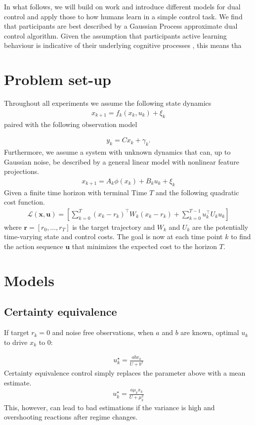 \documentclass[10pt,letterpaper]{article}
\begin{document}
In what follows, we will build on \cite{klenske2015dual} work and introduce different models for dual control and apply those to how humans learn in a simple control task. We find that participants are best described by a Gaussian Process approximate dual control algorithm. Given the assumption that participants active learning behaviour is indicative of their underlying cognitive processes \citep{parpart2015active}, this means tha

\section{Problem set-up}
Throughout all experiments we assume the following state dynamics
\begin{align*}
x_{k+1}=f_k(x_k, u_k)+\xi_k
\end{align*}
paired with the following observation model

\begin{align*}
y_k=Cx_k+\gamma_k.
\end{align*}
Furthermore, we assume a system with unknown dynamics that can, up to Gaussian noise, be described by a general linear model with nonlinear feature projections. 
\begin{align*}
x_{k+1}=A_k \phi(x_k)+B_ku_k+\xi_k
\end{align*}
Given a finite time horizon with terminal Time $T$ and the following quadratic cost function.
\begin{align*}
\mathcal{L}(\mathbf{x,u})=\left[\sum_{k=0}^T(x_k-r_k)^\top W_k(x_k-r_k)+\sum_{k=0}^{T-1}u_k^\top U_ku_k \right]
\end{align*}
where $\mathbf{r}=[r_0, \dots, r_T]$ is the target trajectory and $W_k$ and $U_k$ are the potentially time-varying state and control costs. The goal is now at each time point $k$ to find the action sequence $\mathbf{u}$ that minimizes the expected cost to the horizon $T$.

\section{Models}
\subsection{Certainty equivalence}
If target $r_k=0$ and noise free observations, when $a$ and $b$ are known, optimal $u_k$ to drive $x_k$ to 0:

\begin{align*}
u_k^\star=\frac{abx_k}{U+b^2}
\end{align*}
Certainty equivalence control simply replaces the parameter above with a mean estimate. 
\begin{align*}
u_k^\star=\frac{a\mu_kx_k}{U+\mu_k^2}
\end{align*}
This, however, can lead to bad estimations if the variance is high and overshooting reactions after regime changes.
\end{document}
